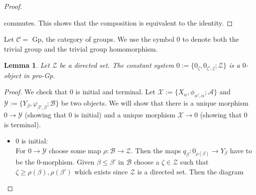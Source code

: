 \documentclass[a4paper,11pt]{article}
\theoremstyle{definition}
\theoremstyle{plain}
\newtheorem{lemma}[definition]{Lemma}
\theoremstyle{remark}
\DeclareMathOperator{\id}{id}
\begin{document}
{\begin{proof}
\begin{figure}[H]
\center
{}
 \end{figure}

commutes. This shows that the composition is equivalent to the identity. 
 
\end{proof}

Let $\mathcal{C} = $ Gp, the category of groups. We use the symbol $0$ to denote both the trivial group and the trivial group homomorphism. 

\begin{lemma} Let $\mathcal{Z}$ be a directed set. The constant system $0:=\{0_{\zeta},0_{\zeta',\zeta}; \mathcal{Z}\}$ is a $0$-object in pro-Gp. 
\end{lemma}

\begin{proof} We check that $0$ is initial and terminal. Let $\mathcal{X}:=\{X_{\alpha}, \phi_{\alpha',\alpha}; \mathcal{A}\}$ and $\mathcal{Y}:=\{Y_{\beta}, \varphi_{\beta',\beta};\mathcal{B}\}$ be two objects. We will show that there is a unique morphism $0\rightarrow \mathcal{Y}$ (showing that $0$ is initial) and a unique morphism $\mathcal{X}\rightarrow 0$ (showing that $0$ is terminal). 
\begin{itemize}
\item $0$ is initial:\\

For $0\rightarrow \mathcal{Y}$ choose some map $\rho:\mathcal{B}\rightarrow \mathcal{Z}$. Then the maps $q_{\beta}: 0_{\rho(\beta)}\rightarrow Y_{\beta}$ have to be the $0$-morphism. Given $\beta\leq \beta'$ in $\mathcal{B}$ choose a $\zeta\in \mathcal{Z}$ such that $\zeta\geq \rho(\beta), \rho(\beta')$ which exists since $\mathcal{Z}$ is a directed set. Then the diagram 


\begin{figure}[H]
\center
{}
 \end{figure}
 

\end{itemize}
\end{proof}}
\end{document}
